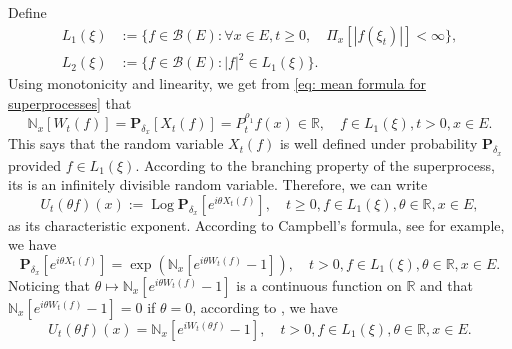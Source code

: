 \documentclass[12pt,a4paper]{amsart}
\theoremstyle{plain}
\theoremstyle{definition}
\numberwithin{equation}{section}
\begin{document}
    Define
\begin{equation}\begin{split}
    L_1(\xi)
    &:= \{f\in \mathcal B(E): \forall x\in E, t\geq 0, \quad \Pi_x[|f(\xi_t)|]< \infty\},
    \\L_2(\xi)
    &:= \{f \in \mathcal B(E): |f|^2 \in L_1(\xi)\}.
\end{split}\end{equation}
    Using monotonicity and linearity, we get from \eqref{eq: mean formula for superprocesses}  that
\begin{equation}
    \mathbb N_x[W_t(f)]
    =\mathbf P_{\delta_x}[X_t(f)]=P^{\rho_1}_t f(x) \in \mathbb R,
    \quad f\in L_1(\xi), t > 0,x\in E.
\end{equation}
    This says that the random variable $X_t(f)$ is well defined under probability $\mathbf P_{\delta_x}$ provided $f\in L_1(\xi)$.
    According to the branching property of the superprocess, its is an infinitely divisible random variable.
    Therefore, we can write
\[
    U_t(\theta f)(x) := \operatorname{Log} \mathbf P_{\delta_x}[e^{i \theta X_t(f)}],
    \quad t\geq 0, f\in L_1(\xi), \theta \in \mathbb R, x\in E,
\]
    as its characteristic exponent.
    According to Campbell's formula, see \cite[Theorem 2.7]{Kyprianou2014Fluctuations} for example, we have
\[
    \mathbf P_{\delta_x} [e^{i\theta X_t(f)}]
    = \exp(\mathbb N_x[ e^{i\theta W_t(f)} - 1]),
    \quad t>0, f\in L_1(\xi), \theta \in \mathbb R, x\in E.
\]
    Noticing that $\theta \mapsto \mathbb N_x[e^{i\theta W_t(f)} - 1]$ is a continuous function on $\mathbb R$ and that $\mathbb N_x[e^{i\theta W_t(f)} - 1] = 0$ if $\theta = 0$, according to \cite[Lemma 7.6]{Sato1999Levy}, we have
\begin{equation}
\label{eq: N and characteristic exponent}
    U_t(\theta f)(x) = \mathbb N_x[e^{i W_t(\theta f)} - 1],
    \quad t>0, f\in L_1(\xi), \theta \in \mathbb R, x\in E.
\end{equation}
\end{document}
